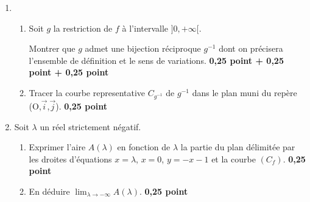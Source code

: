 \documentclass[12pt]{article}
\begin{document}
\begin{enumerate}
\item
\begin{enumerate}
\item[a.] Soit $g$ la restriction de $f$ à l'intervalle $]0, +\infty[.$

	 Montrer que $g$ admet une bijection réciproque $g^{-1}$ dont on précisera l'ensemble de définition et le
	 sens de variations. \textbf{ 0,25 point + 0,25 point + 0,25 point}
\item[b.] Tracer la courbe representative $C_{g^{-1}}$ de $g^{-1}$ dans le plan muni du repère \\
			(O,$\vec{i}$,$\vec{j}$). \textbf{ 0,25 point}
\end{enumerate}
\item Soit $\lambda$ un réel strictement négatif.
\begin{enumerate}
\item[a.] Exprimer l'aire $A(\lambda)$ en fonction de $\lambda$ la partie du plan délimitée par les droites d'équations $x=\lambda$, $x=0$, $y=-x-1$ et la courbe $(C_{f})$. \textbf{ 0,25 point}
\item[b.] En déduire $\lim_{\lambda \to -\infty}A(\lambda)$. \textbf{ 0,25 point}
\end{enumerate}
\end{enumerate}
\end{document}
